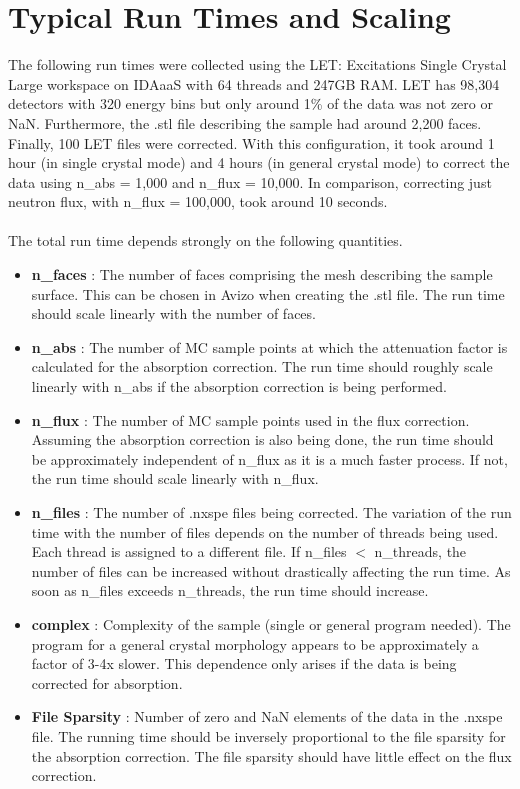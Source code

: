\documentclass{article}
\begin{document}
\section{Typical Run Times and Scaling}
The following run times were collected using the LET: Excitations Single Crystal Large workspace on IDAaaS with 64 threads and 247GB RAM. LET has 98,304 detectors with 320 energy bins but only around 1\% of the data was not zero or NaN. Furthermore, the .stl file describing the sample had around 2,200 faces. Finally, 100 LET files were corrected. With this configuration, it took around 1 hour (in single crystal mode) and 4 hours (in general crystal mode) to correct the data using n\_abs = 1,000 and n\_flux = 10,000. In comparison, correcting just neutron flux, with n\_flux = 100,000, took around 10 seconds. \\
\\
The total run time depends strongly on the following quantities.
\begin{itemize}
    \item \textbf{n\_faces} : The number of faces comprising the mesh describing the sample surface. This can be chosen in Avizo when creating the .stl file. The run time should scale linearly with the number of faces.
    \item \textbf{n\_abs} : The number of MC sample points at which the attenuation factor is calculated for the absorption correction. The run time should roughly scale linearly with n\_abs if the absorption correction is being performed.
    \item \textbf{n\_flux} : The number of MC sample points used in the flux correction. Assuming the absorption correction is also being done, the run time should be approximately independent of n\_flux as it is a much faster process. If not, the run time should scale linearly with n\_flux.
    \item \textbf{n\_files} : The number of .nxspe files being corrected. The variation of the run time with the number of files depends on the number of threads being used. Each thread is assigned to a different file. If n\_files $<$ n\_threads, the number of files can be increased without drastically affecting the run time. As soon as n\_files exceeds n\_threads, the run time should increase.
    \item \textbf{complex} : Complexity of the sample (single or general program needed). The program for a general crystal morphology appears to be approximately a factor of 3-4x slower. This dependence only arises if the data is being corrected for absorption.
    \item \textbf{File Sparsity} : Number of zero and NaN elements of the data in the .nxspe file. The running time should be inversely proportional to the file sparsity for the absorption correction. The file sparsity should have little effect on the flux correction.
\end{itemize}
\end{document}
